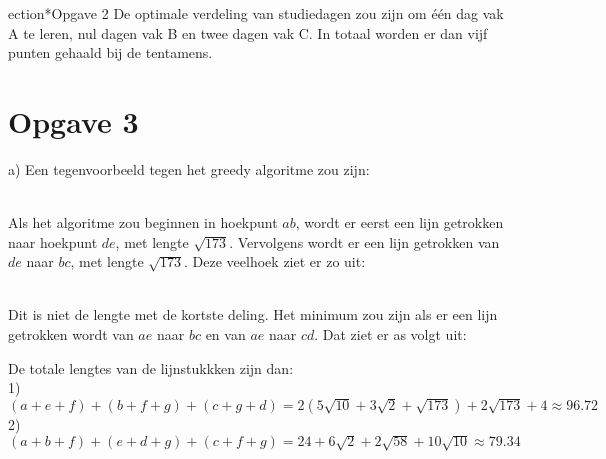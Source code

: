ection*{Opgave 2}
De optimale verdeling van studiedagen zou zijn om één dag vak A te leren, nul dagen vak B en twee dagen vak C. In totaal worden er dan vijf punten gehaald bij de tentamens.\\

\section*{Opgave 3}
a) Een tegenvoorbeeld tegen het greedy algoritme zou zijn:\\

    \\
    Als het algoritme zou beginnen in hoekpunt $ab$, wordt er eerst een lijn getrokken naar hoekpunt $de$, met lengte $\sqrt{173}$. Vervolgens wordt er een lijn getrokken van $de$ naar $bc$, met lengte $\sqrt{173}$.
    Deze veelhoek ziet er zo uit:\\

        \\
        Dit is niet de lengte met de kortste deling. Het minimum zou zijn als er een lijn getrokken wordt van $ae$ naar $bc$ en van $ae$ naar $cd$. Dat ziet er as volgt uit:\\

            De totale lengtes van de lijnstukkken zijn dan:\\
            1) $(a+e+f)+(b+f+g)+(c+g+d) = 2(5\sqrt{10} + 3\sqrt{2} + \sqrt{173}) + 2\sqrt{173} + 4 \approx 96.72$\\
            2) $(a+b+f)+(e+d+g)+(c+f+g) = 24 + 6\sqrt{2} + 2\sqrt{58} + 10\sqrt{10} \approx 79.34$\\

